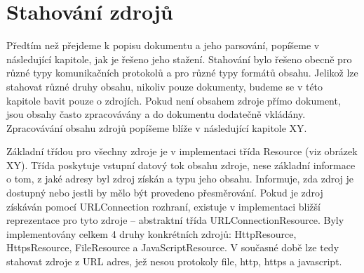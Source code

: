 \section{Stahování zdrojů}
\label{Chapter.Implementation.DownloadingResources}

Předtím než přejdeme k popisu dokumentu a jeho parsování, popíšeme v následující kapitole, jak je řešeno jeho stažení. Stahování bylo řešeno obecně pro různé typy komunikačních protokolů a pro různé typy formátů obsahu. Jelikož lze stahovat různé druhy obsahu, nikoliv pouze dokumenty, budeme se v této kapitole bavit pouze o zdrojích. Pokud není obsahem zdroje přímo dokument, jsou obsahy často zpracovávány a do dokumentu dodatečně vkládány. Zpracovávání obsahu zdrojů popíšeme blíže v následující kapitole XY.

Základní třídou pro všechny zdroje je v implementaci třída Resource (viz obrázek XY). Třída poskytuje vstupní datový tok obsahu zdroje, nese základní informace o tom, z jaké adresy byl zdroj získán a typu jeho obsahu. Informuje, zda zdroj je dostupný nebo jestli by mělo být provedeno přesměrování. Pokud je zdroj získáván pomocí URLConnection rozhraní, existuje v implementaci bližší reprezentace pro tyto zdroje – abstraktní třída URLConnectionResource. Byly implementovány celkem 4 druhy konkrétních zdrojů: HttpResource, HttpsResource, FileResource a JavaScriptResource. V současné době lze tedy stahovat zdroje z URL adres, jež nesou protokoly file, http, https a javascript.

